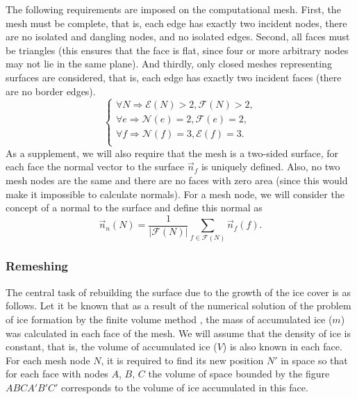 The following requirements are imposed on the computational mesh.
First, the mesh must be complete, that is, each edge has exactly two incident nodes, there are no isolated and dangling nodes, and no isolated edges.
Second, all faces must be triangles (this ensures that the face is flat, since four or more arbitrary nodes may not lie in the same plane).
And thirdly, only closed meshes representing  surfaces are
considered, that is, each edge has exactly two incident faces (there
are no border edges).
\begin{equation}\label{eq_arch}
\begin{cases}
\forall N \Rightarrow \mathscr{E}(N) > 2, \mathscr{F}(N) > 2, \\
\forall e \Rightarrow \mathscr{N}(e) = 2 , \mathscr{F}(e) = 2, \\
\forall f \Rightarrow \mathscr{N}(f) = 3 , \mathscr{E}(f) = 3. \\
\end{cases}
\end{equation}
As a supplement, we will also require that the mesh is a two-sided surface, for each face the normal vector to the surface $\vec{n}_f$ is uniquely defined.
Also, no two mesh nodes are the same and there are no faces with zero area (since this would make it impossible to calculate normals).
For a mesh node, we will consider the concept of a normal to the surface and define this normal as
\begin{equation*}
\vec{n}_n(N) = \frac{1}{|\mathscr{F}(N)|} \sum_{f \in
\mathscr{F}(N)}{\vec{n}_f(f)}.
\end{equation*}


\subsubsection{Remeshing}

The central task of rebuilding the surface due to the growth of the ice cover is as follows.
Let it be known that as a result of the numerical solution of the problem of ice formation by the finite volume method \cite{Beaugendre}, the mass of accumulated ice ($m$) was calculated in each face of the mesh.
We will assume that the density of ice is constant, that is, the volume of accumulated ice ($V$) is also known in each face.
For each mesh node $N$, it is required to find its new position $N'$ in space so that for each face with nodes $A$, $B$, $C$ the volume of space bounded by the figure $ABCA'B'C'$ corresponds to the volume of ice accumulated in this face.

